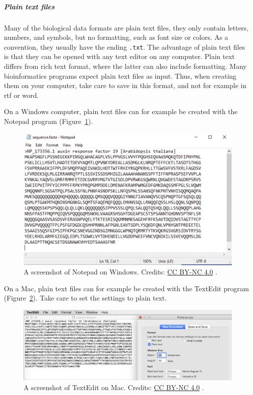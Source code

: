 \subparagraph{Plain text files}

Many of the biological data formats are plain text files, they only contain letters, numbers, and symbols, but no formatting, such as font size or colors.
As a convention, they usually have the ending \texttt{.txt}.
The advantage of plain text files is that they can be opened with any text editor on any computer.
Plain text differs from rich text format, where the latter can also include formatting.
Many bioinformatics programs expect plain text files as input.
Thus, when creating them on your computer, take care to save in this format, and not for example in rtf or word.

On a Windows computer, plain text files can for example be created with the Notepad program (Figure~\ref{notepad}).

\begin{figure}[!htbp]
\centering
\includegraphics[width=0.7\linewidth]{files/notepad-5b8ceca90dcca4116236b117fb2fa376.png}
\caption[]{A screenshot of Notepad on Windows.
Credits: \href{https://creativecommons.org/licenses/by-nc/4.0/}{CC BY-NC 4.0} \cite{own_1_2024}.}
\label{notepad}
\end{figure}

On a Mac, plain text files can for example be created with the TextEdit program (Figure~\ref{textedit}).
Take care to set the settings to plain text.

\begin{figure}[!htbp]
\centering
\includegraphics[width=1\linewidth]{files/textedit-0cc959f5c3e7cca8c6a83748cdd24856.png}
\caption[]{A screenshot of TextEdit on Mac.
Credits: \href{https://creativecommons.org/licenses/by-nc/4.0/}{CC BY-NC 4.0} \cite{own_1_2024}.}
\label{textedit}
\end{figure}

